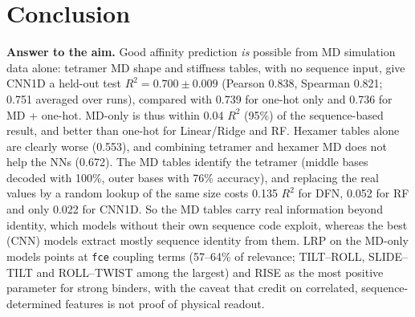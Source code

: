 \documentclass[11pt,a4paper]{article}
\begin{document}
\section{Conclusion}
\textbf{Answer to the aim.} Good affinity prediction \emph{is} possible from MD simulation data alone: tetramer MD shape and stiffness tables, with no sequence input, give CNN1D a held-out test $R^2=0.700\pm0.009$ (Pearson 0.838, Spearman 0.821; 0.751 averaged over runs), compared with 0.739 for one-hot only and 0.736 for MD + one-hot. MD-only is thus within 0.04 $R^2$ (95\%) of the sequence-based result, and better than one-hot for Linear/Ridge and RF. Hexamer tables alone are clearly worse (0.553), and combining tetramer and hexamer MD does not help the NNs (0.672). The MD tables identify the tetramer (middle bases decoded with 100\%, outer bases with 76\% accuracy), and replacing the real values by a random lookup of the same size costs 0.135 $R^2$ for DFN, 0.052 for RF and only 0.022 for CNN1D. So the MD tables carry real information beyond identity, which models without their own sequence code exploit, whereas the best (CNN) models extract mostly sequence identity from them. LRP on the MD-only models points at \texttt{fce} coupling terms (57--64\% of relevance; TILT--ROLL, SLIDE--TILT and ROLL--TWIST among the largest) and RISE as the most positive parameter for strong binders, with the caveat that credit on correlated, sequence-determined features is not proof of physical readout.
\end{document}
